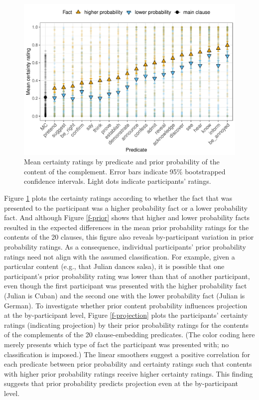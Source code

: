 \documentclass[11pt,fleqn]{article}
\newcommand{\6}{\mbox{$[\hspace*{-.6mm}[$}}
\newcommand{\9}{\mbox{$]\hspace*{-.6mm}]$}}
\begin{document}
\begin{figure}[h!]
\centering

\includegraphics[width=.75\paperwidth]{../../results/exp4/graphs/means-projectivity-by-predicate-and-prior}

\caption{Mean certainty ratings by predicate and prior probability of the content of the complement. Error bars indicate 95\% bootstrapped confidence intervals. Light dots indicate participants' ratings.} 
\label{f-projection-mean}
\end{figure}

Figure \ref{f-projection-mean} plots the certainty ratings according to whether the fact that was presented to the participant was a higher probability fact or a lower probability fact. And although Figure \ref{f-prior} shows that higher and lower probability facts resulted in the expected differences in the mean prior probability ratings for the contents of the 20 clauses, this figure also reveals by-participant variation in prior probability ratings. As a consequence, individual participants' prior probability ratings need not align with the assumed classification. For example, given a particular content (e.g., that Julian dances salsa), it is possible that one participant's prior probability rating was lower than that of another participant, even though the first participant was presented with the higher probability fact (Julian is Cuban) and the second one with the lower probability fact (Julian is German). To investigate whether prior content probability influences projection at the by-participant level, Figure \ref{f-projection} plots the participants' certainty ratings (indicating projection) by their prior probability ratings for the contents of the complements of the 20 clause-embedding predicates. (The color coding here merely presents which type of fact the participant was presented with; no classification is imposed.) The linear smoothers suggest a positive correlation for each predicate between prior probability and certainty ratings such that contents with higher prior probability ratings receive higher certainty ratings. This finding suggests that prior probability predicts projection even at the by-participant level.
\end{document}
